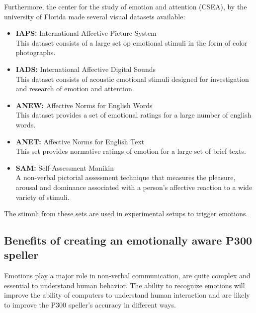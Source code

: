 Furthermore, the center for the study of emotion and attention (CSEA), by the university of Florida made several visual datasets available:
\begin{itemize}
\item \textbf{IAPS:} International Affective Picture System\\
This dataset consists of a large set op emotional stimuli in the form of color photographs.
\item \textbf{IADS:} International Affective Digital Sounds \\
This dataset consists of acoustic emotional stimuli designed for investigation and research of emotion and attention.
\item \textbf{ANEW:} Affective Norms for English Words\\
This dataset provides a set of emotional ratings for a large number of english words.
\item \textbf{ANET:} Affective Norms for English Text\\
This set provides normative ratings of emotion for a large set of brief texts.
\item \textbf{SAM:} Self-Assessment Manikin\\
A non-verbal pictorial assessment technique that measures the pleasure, arousal and dominance associated with a person's affective reaction to a wide variety of stimuli.
\end{itemize}
The stimuli from these sets are used in experimental setups to trigger emotions\cite{ExtendedPaper, EmotionSite, RealTimeEEGEmotion, EEGDatasets}.


\subsection{Benefits of creating an emotionally aware P300 speller}

Emotions play a major role in non-verbal communication, are quite complex and essential to understand human behavior. The ability to recognize emotions will improve the ability of computers to understand human interaction\cite{CompRecognizeEmotion} and are likely to improve the P300 speller's accuracy in different ways.

